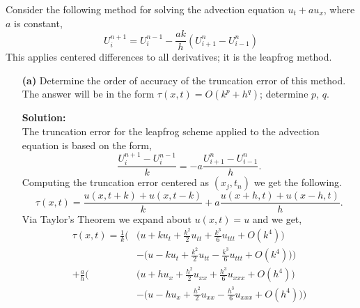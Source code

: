 \documentclass[12pt]{article}
\makeatletter
\theoremstyle{homework}
\newenvironment{exercise}[1]
{\def\@currentlabel{#1}\exercisecore}
{\endexercisecore}
\newcommand{\localhead}[1]{\par\smallskip\noindent\textbf{#1}\nobreak\\}%
\newcommand\solution{\localhead{Solution:}}
\makeatother
\begin{document}
\begin{exercise}{Problem P37} Consider the following method for solving the advection equation $u_t + au_x$, where $a$ is constant, 
  \begin{equation*}
    U_i^{n+1} = U_i^{n - 1} - \frac{ak}{h}(U_{i+1}^n - U_{i-1}^n)
  \end{equation*}
  This applies centered differences to all derivatives; it is the leapfrog method. 

  \begin{enumerate}
    \item[\textbf{(a)}] Determine the order of accuracy of the truncation error of this method. The answer will be in the form $\tau(x, t) = O(k^p + h^q)$; determine $p$, $q$. 
    \solution The truncation error for the leapfrog scheme applied to the advection equation is based on the form, 
    \begin{equation*}
      \frac{U_i^{n+1} - U_i^{n - 1}}{k} = -a\frac{U_{i+1}^n - U_{i-1}^n}{h}.
    \end{equation*}
    Computing the truncation error centered as $(x_j,t_n)$ we get the following. 
    \begin{equation*}
      \tau(x, t) = \frac{u(x, t + k) + u(x, t - k)}{k} + a \frac{u(x + h, t) + u(x - h, t)}{h}.
    \end{equation*}
    Via Taylor's Theorem we expand about $u(x, t) = u$ and we get, 
    \begin{align*}
      \tau(x, t) = \frac{1}{k} \biggl( &\bigl( u + ku_t + \frac{k^2}{2}u_{tt} + \frac{k^3}{6}u_{ttt} + O(k^4)\bigr)\\
      &-\bigl(u - ku_t + \frac{k^2}{2}u_{tt} - \frac{k^3}{6}u_{ttt} + O(k^4)\bigr)\biggr)\\
      +\frac{a}{h} \biggl( &\bigl( u + hu_x + \frac{h^2}{2}u_{xx} + \frac{h^3}{6}u_{xxx} + O(h^4)\bigr)\\
      &-\bigl(u - hu_x + \frac{h^2}{2}u_{xx} - \frac{h^3}{6}u_{xxx} + O(h^4)\bigr)\biggr)
    \end{align*}


\end{enumerate}
\end{exercise}
\end{document}
